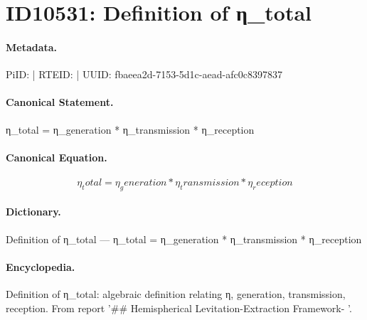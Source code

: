 \section*{ID10531: Definition of η\_total}
\paragraph{Metadata.}
PiID:  | RTEID:  | UUID: fbaeea2d-7153-5d1c-aead-afc0c8397837

\paragraph{Canonical Statement.}
η\_total = η\_generation * η\_transmission * η\_reception

\paragraph{Canonical Equation.}
\[
η_total = η_generation * η_transmission * η_reception
\]

\paragraph{Dictionary.}
Definition of η\_total — η\_total = η\_generation * η\_transmission * η\_reception

\paragraph{Encyclopedia.}
Definition of η\_total: algebraic definition relating η, generation, transmission, reception. From report '\#\# Hemispherical Levitation-Extraction Framework- '.
